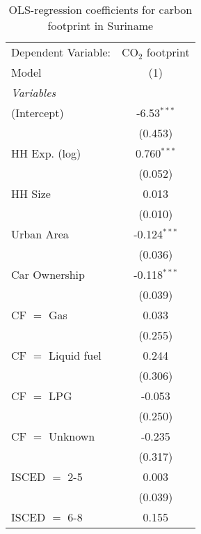 
\begin{table}[htbp!]
   \centering
   \small
   \begin{adjustbox}{width = 1\textwidth, max height = 0.95\textheight, center}
      \begin{threeparttable}[b]
         \caption{\label{tab:OLS_2_SUR} OLS-regression coefficients for carbon footprint in Suriname}
         \begin{tabular}{lc}
            \tabularnewline \midrule \midrule
            Dependent Variable: & CO$_{2}$ footprint\\  
            Model               & (1)\\  
            \midrule
            \emph{Variables}\\
            (Intercept)         & -6.53$^{***}$\\   
                                & (0.453)\\   
            HH Exp. (log)       & 0.760$^{***}$\\   
                                & (0.052)\\   
            HH Size             & 0.013\\   
                                & (0.010)\\   
            Urban Area          & -0.124$^{***}$\\   
                                & (0.036)\\   
            Car Ownership       & -0.118$^{***}$\\   
                                & (0.039)\\   
            CF $=$ Gas          & 0.033\\   
                                & (0.255)\\   
            CF $=$ Liquid fuel  & 0.244\\   
                                & (0.306)\\   
            CF $=$ LPG          & -0.053\\   
                                & (0.250)\\   
            CF $=$ Unknown      & -0.235\\   
                                & (0.317)\\   
            ISCED $=$ 2-5       & 0.003\\   
                                & (0.039)\\   
            ISCED $=$ 6-8       & 0.155\\   

\end{tabular}
\end{threeparttable}
\end{adjustbox}
\end{table}
